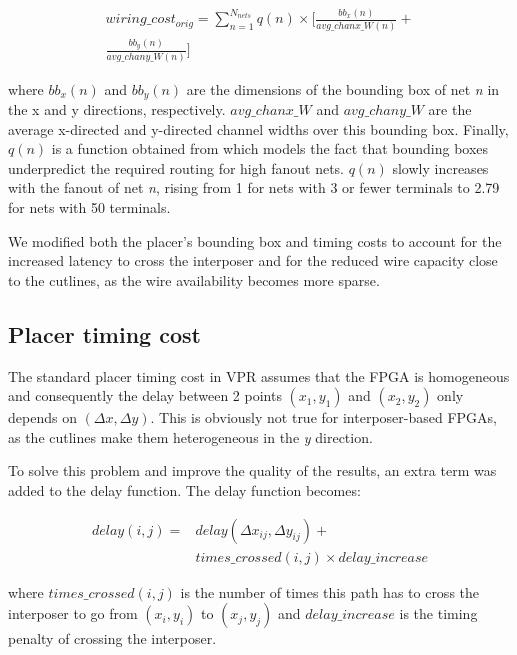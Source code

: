 \documentclass{sig-alternate-2013}
\begin{document}
\begin{equation} \label{eq:bbcost}
\begin{split}
wiring\_cost_{orig} = \sum_{n=1}^{N_{nets}} q(n) \times [\frac{bb_x(n)}{avg\_chanx\_W(n)} + \\
\frac{bb_y(n)}{avg\_chany\_W(n)}]
\end{split}
\end{equation}

where $bb_x(n)$ and $bb_y(n)$ are the dimensions of the bounding box of net \textit{n} in the x and y directions, respectively. $avg\_chanx\_W$ and $avg\_chany\_W$ are the average x-directed and y-directed channel widths over this bounding box. Finally, $q(n)$ is a function obtained from \cite{icann} which models the fact that bounding boxes underpredict the required routing for high fanout nets. $q(n)$ slowly increases with the fanout of net \textit{n}, rising from 1 for nets with 3 or fewer terminals to 2.79 for nets with 50 terminals.

We modified both the placer's bounding box and timing costs to account for the increased latency to cross the interposer and for the reduced wire capacity close to the cutlines, as the wire availability becomes more sparse.

\subsection{Placer timing cost}
The standard placer timing cost in VPR assumes that the FPGA is homogeneous and consequently the delay between 2 points $(x_1,y_1)$ and $(x_2,y_2)$ only depends on $(\Delta x,\Delta y)$. This is obviously not true for interposer-based FPGAs, as the cutlines make them heterogeneous in the \textit{y} direction.

To solve this problem and improve the quality of the results, an extra term was added to the delay function. The delay function becomes:

\begin{equation} \label{eq:timing_cost}
\begin{split}
delay(i,j) =& delay(\Delta x_{ij}, \Delta y_{ij}) + \\
&times\_crossed(i,j) \times delay\_increase
\end{split}
\end{equation}

where $times\_crossed(i,j)$ is the number of times this path has to cross the interposer to go from $(x_i,y_i)$ to $(x_j,y_j)$ and $delay\_increase$ is the timing penalty of crossing the interposer.
\end{document}
